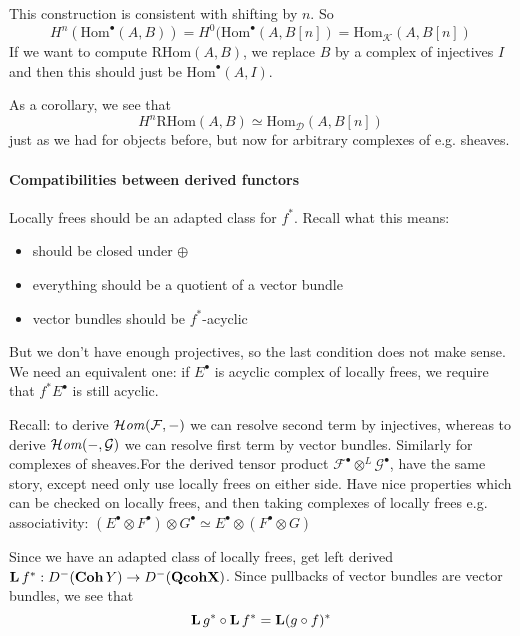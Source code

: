 This construction is consistent with shifting by $n$. So $$H^n(\mathrm{Hom}^\bullet(A,B))=H^0(\mathrm{Hom}^\bullet(A,B[n])=\mathrm{Hom}_{\mathcal{K}}(A,B[n])$$
If we want to compute $\mathrm{RHom}(A,B)$, we replace $B$ by a complex of injectives $I$ and then this should just be $\mathrm{Hom}^\bullet(A,I)$. 

As a corollary, we see that $$H^n\mathrm{RHom}(A,B)\simeq \mathrm{Hom}_{\mathcal{D}}(A,B[n])$$just as we had for objects before, but now for arbitrary complexes of e.g. sheaves.

\paragraph{Compatibilities between derived functors}

Locally frees should be an adapted class for $f^*$. Recall what this means: 
\begin{itemize}
    \item should be closed under $\oplus$
    \item everything should be a quotient of a vector bundle
    \item vector bundles should be $f^*$-acyclic
\end{itemize}

But we don't have enough projectives, so the last condition does not make sense. We need an equivalent one: if $E^\bullet$ is acyclic complex of locally frees, we require that $f^*E^\bullet$ is still acyclic.

Recall: to derive $\operatorname{\mathcal{H}\mathit{om}}(\mathcal{F}, -)$ we can resolve second term by injectives, whereas to derive $\operatorname{\mathcal{H}\mathit{om}}(-,\mathcal{G})$ we can resolve first term by vector bundles. Similarly for complexes of sheaves.For the derived tensor product $\mathcal{F}^\bullet\otimes^L \mathcal{G}^\bullet$, have the same story, except need only use locally frees on either side. Have nice properties which can be checked on locally frees, and then taking complexes of locally frees e.g. associativity: $(E^\bullet \otimes F^\bullet ) \otimes G^\bullet \simeq E^\bullet \otimes (F^\bullet \otimes G)$

Since we have an adapted class of locally frees, get left derived $\operatorname{\mathbf{L}} f^*:D^-(\mathbf{Coh}\,Y)\rightarrow D^-(\mathbf{Qcoh X})$. Since pullbacks of vector bundles are vector bundles, we see that $$\operatorname{\mathbf{L}} g^*\circ \operatorname{\mathbf{L}} f^*=\operatorname{\mathbf{L}} (g\circ f)^*$$


